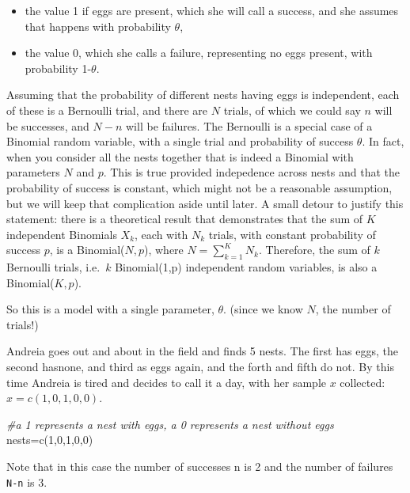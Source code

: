 \documentclass[
]{book}
\newenvironment{Shaded}{\begin{snugshade}}{\end{snugshade}}
\newcommand{\CommentTok}[1]{\textcolor[rgb]{0.56,0.35,0.01}{\textit{#1}}}
\newcommand{\DecValTok}[1]{\textcolor[rgb]{0.00,0.00,0.81}{#1}}
\newcommand{\FunctionTok}[1]{\textcolor[rgb]{0.00,0.00,0.00}{#1}}
\newcommand{\NormalTok}[1]{#1}
\newcommand{\OtherTok}[1]{\textcolor[rgb]{0.56,0.35,0.01}{#1}}
\providecommand{\tightlist}{%
  \setlength{\itemsep}{0pt}\setlength{\parskip}{0pt}}
\begin{document}
\begin{itemize}
\tightlist
\item
  the value 1 if eggs are present, which she will call a success, and she assumes that happens with probability \(\theta\),
\item
  the value 0, which she calls a failure, representing no eggs present, with probability 1-\(\theta\).
\end{itemize}

Assuming that the probability of different nests having eggs is independent, each of these is a Bernoulli trial, and there are \(N\) trials, of which we could say \(n\) will be successes, and \(N-n\) will be failures. The Bernoulli is a special case of a Binomial random variable, with a single trial and probability of success \(\theta\). In fact, when you consider all the nests together that is indeed a Binomial with parameters \(N\) and \(p\). This is true provided indepedence across nests and that the probability of success is constant, which might not be a reasonable assumption, but we will keep that complication aside until later. A small detour to justify this statement: there is a theoretical result that demonstrates that the sum of \(K\) independent Binomials \(X_k\), each with \(N_k\) trials, with constant probability of success \(p\), is a Binomial(\(N,p\)), where \(N=\sum_{k=1}^K N_k\). Therefore, the sum of \(k\) Bernoulli trials, i.e.~\(k\) Binomial(1,p) independent random variables, is also a Binomial(\(K,p\)).

So this is a model with a single parameter, \(\theta\). (since we know \(N\), the number of trials!)

Andreia goes out and about in the field and finds 5 nests. The first has eggs, the second hasnone, and third as eggs again, and the forth and fifth do not. By this time Andreia is tired and decides to call it a day, with her sample \(x\) collected: \(x=c(1,0,1,0,0)\).

\begin{Shaded}
\begin{Highlighting}[]
\CommentTok{\#a 1 represents a nest with eggs, a 0 represents a nest without eggs}
\NormalTok{nests}\OtherTok{=}\FunctionTok{c}\NormalTok{(}\DecValTok{1}\NormalTok{,}\DecValTok{0}\NormalTok{,}\DecValTok{1}\NormalTok{,}\DecValTok{0}\NormalTok{,}\DecValTok{0}\NormalTok{)}
\end{Highlighting}
\end{Shaded}

Note that in this case the number of successes n is 2 and the number of failures \texttt{N-n} is 3.
\end{document}
